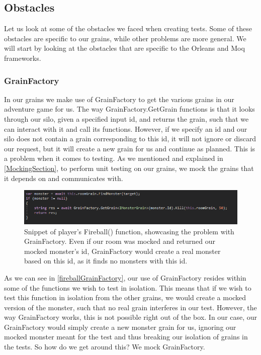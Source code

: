 \subsection{Obstacles}
Let us look at some of the obstacles we faced when creating tests. Some of these obstacles are specific to our grains, while other problems are more general. We will start by looking at the obstacles that are specific to the Orleans and Moq frameworks.
\subsubsection{GrainFactory} \label{GrainFactorySection}
In our grains we make use of GrainFactory to get the various grains in our adventure game for us. The way GrainFactory.GetGrain functions is that it looks through our silo, given a specified input id, and returns the grain, such that we can interact with it and call its functions. However, if we specify an id and our silo does not contain a grain corresponding to this id, it will not ignore or discard our request, but it will create a new grain for us and continue as planned.  This is a problem when it comes to testing. As we mentioned and explained in \autoref{MockingSection}, to perform unit testing on our grains, we mock the grains that it depends on and communicates with. 
\begin{figure}[h]
    \centering
    \includegraphics[width=\linewidth]{Materials/TestingTheory/FireballGrainFactory}
    \caption{Snippet of player's Fireball() function, showcasing the problem with GrainFactory. Even if our room was mocked and returned our mocked monster's id, GrainFactory would create a real monster based on this id, as it finds no monsters with this id.}
    \label{fireballGrainFactory}
\end{figure}
As we can see in \autoref{fireballGrainFactory}, our use of GrainFactory resides within some of the functions we wish to test in isolation. This means that if we wish to test this function in isolation from the other grains, we would create a mocked version of the monster, such that no real grain interferes in our test. However, the way GrainFactory works, this is not possible right out of the box. In our case, our GrainFactory would simply create a new monster grain for us, ignoring our mocked monster meant for the test and thus breaking our isolation of grains in the tests. So how do we get around this? We mock GrainFactory. \\
